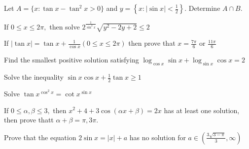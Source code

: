 \item Let $A = \{x: \tan x -\tan^2x > 0\}$ and $y = \left\{x: |\sin x|<\frac{1}{2}\right\}$. Determine $A\cap B.$
\item If $0\leq x\leq 2\pi,$ then solve $2^{\frac{1}{\sin^2x}}\sqrt{y^2 - 2y + 2}\leq 2$
\item If $|\tan x| = \tan x + \frac{1}{\cos x}(0\leq x\leq 2\pi)$ then prove that $x = \frac{7\pi}{6}$ or
     $\frac{11\pi}{6}$
\item Find the smallest positive solution satisfying $\log_{\cos x}\sin x + \log_{\sin x}\cos x = 2$
\item Solve the inequality $\sin x\cos x + \frac{1}{2}\tan x\geq 1$
\item Solve $\tan x^{\cos^2 x} = \cot x^{\sin x}$
\item If $0\leq \alpha, \beta \leq 3,$ then $x^2 + 4 + 3\cos(\alpha x + \beta) = 2x$ has at least one solution, then
     prove thatt $\alpha + \beta = \pi, 3\pi.$
\item Prove that the equation $2\sin x = |x| + a$ has no solution for $a\in \left(\frac{3\sqrt{3 - \pi}}{3}, \infty\right)$
\stopitemize
